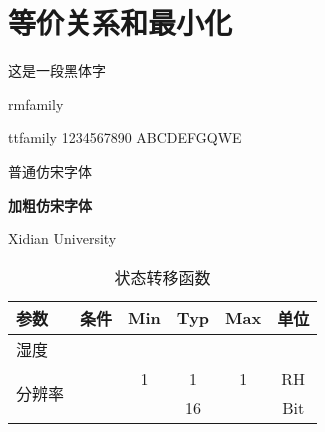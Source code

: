 \chapter{等价关系和最小化}

{\heiti 这是一段黑体字}

{\rmfamily rmfamily}

{\ttfamily ttfamily 1234567890 ABCDEFGQWE}

{\fangsong 普通仿宋字体}

{\fangsong\bfseries 加粗仿宋字体}

Xidian University

\begin{table}[!htbp]
    \caption{状态转移函数}
    \label{tab:sample2}
    \centering
    \small%
    \setlength{\tabcolsep}{4pt}%
    \renewcommand{\arraystretch}{1.2}%
    \begin{tabular}{l|c|c|c|c|c} 
        \hline
        参数 & 条件 & Min & Typ & Max & 单位 \\
        \hline
        \multicolumn{6}{l}{湿度} \\
        \hline
        \multirow{2}{*}{分辨率} & \multirow{2}{*}{ } & 1 & 1 & 1 & RH \\

        \cline{3-6}            &                    &   & 16 &  &  Bit \\
        \hline
    \end{tabular}
\end{table}

        

